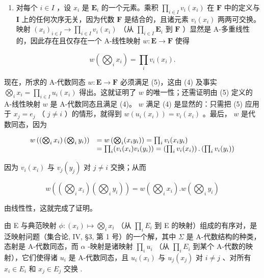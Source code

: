 \begin{enumerate}
\def\labelenumi{(\roman{enumi})}
\setcounter{enumi}{1}
\tightlist
\item
  对每个 \(i \in I\) ，设 \(x_{i}\) 是 \(\mathbf{E}_{i}\) 的一个元素。乘积 \(\prod_{i \in I} v_{i}(x_{i})\) 在 \(\mathbf{F}\) 中的定义与 \(\mathbf{I}\) 上的任何次序无关，因为代数 \(\mathbf{F}\) 是结合的，且诸元素 \(v_{i}(x_{i})\) 两两可交换。映射 \((x_{i})_{i \in I} \to \prod_{i \in I} v_{i}(x_{i})\) （从 \(\prod_{i \in I} \mathbf{E}_{i}\) 到 \(\mathbf{F}\) ）显然是 A-多重线性的，因此存在且仅存在一个 A-线性映射 \(w: \mathbf{E} \to \mathbf{F}\) 使得
\end{enumerate}

\[
w \left(\bigotimes_ {i} x _ {i}\right) = \prod_ {i} v _ {i} \left(x _ {i}\right).\tag{5}
\]

现在，所求的 A-代数同态 \(w: \mathbf{E} \to \mathbf{F}\) 必须满足 (5)，这由 (4) 及事实 \(\bigotimes_{i} x_i = \prod_{i \in I} u_i(x_i)\) 得出。这就证明了 \(w\) 的唯一性；还需证明由 (5) 定义的 A-线性映射 \(w\) 是 A-代数同态且满足 (4)。 \(w\) 满足 (4) 是显然的：只需把 (5) 应用于 \(x_j = e_j\) （ \(j \neq i\) ）的情形，就得到 \(w(u_i(x_i)) = v_i(x_i)\) 。最后， \(w\) 是代数同态，因为

\[
\begin{array}{r l} w \left(\left(\bigotimes_ {i} x _ {i}\right) \left(\bigotimes_ {i} y _ {i}\right)\right) & = w \left(\bigotimes_ {i} (x _ {i} y _ {i})\right) = \prod_ {i} v _ {i} (x _ {i} y _ {i}) \\ & = \prod_ {i} (v _ {i} (x _ {i}) v _ {i} (y _ {i})) = \left(\prod_ {i} v _ {i} (x _ {i})\right). \left(\prod_ {i} v _ {i} (y _ {i})\right) \end{array}
\]

因为 \(v_{i}(x_{i})\) 与 \(v_{j}(y_{j})\) 对 \(j \neq i\) 交换；从而

\[
w \left(\left(\bigotimes_ {i} x _ {i}\right) \left(\bigotimes_ {i} y _ {i}\right)\right) = w \left(\bigotimes_ {i} x _ {i}\right). w \left(\bigotimes_ {i} y _ {i}\right)
\]

由线性性，这就完成了证明。

由 E 与典范映射 \(\phi: (x_i) \mapsto \bigotimes_i x_i\) （从 \(\prod_i E_i\) 到 E 的映射）组成的有序对，是泛映射问题（集合论, IV, §3, 第 1 号）的一个解，其中 \(\Sigma\) 是 A-代数结构的种类，态射是 A-代数同态，而 \(\alpha\) -映射是诸映射 \(\prod_i u_i\) （从 \(\prod_i E_i\) 到某个 A-代数的映射），它们使得诸 \(u_i\) 是 A-代数同态，且 \(u_i(x_i)\) 与 \(u_j(x_j)\) 对 \(i \neq j\) 、对所有 \(x_i \in E_i\) 和 \(x_j \in E_j\) 交换 .


